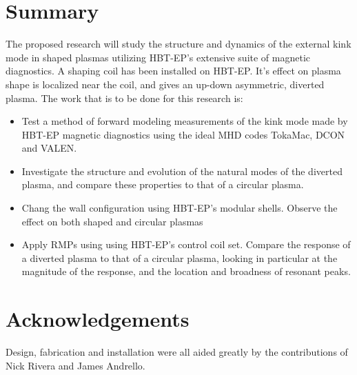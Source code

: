 \documentclass[aps,preprint,showpacs,superscriptaddress,groupedaddress]{revtex4}  %
\begin{document}
\section{Summary}
The proposed research will study the structure and dynamics of the external kink mode in shaped plasmas utilizing HBT-EP's extensive suite of magnetic diagnostics.  A shaping coil has been installed on HBT-EP.  It's effect on plasma shape is localized near the coil, and gives an up-down asymmetric, diverted plasma.  The work that is to be done for this research is:
\begin{itemize}
\item Test a method of forward modeling measurements of the kink mode made by HBT-EP magnetic diagnostics using the ideal MHD codes TokaMac, DCON and VALEN.
\item Investigate the structure and evolution of the natural modes of the diverted plasma, and compare these properties to that of a circular plasma.
\item Chang the wall configuration using HBT-EP's modular shells.  Observe the effect on both shaped and circular plasmas
\item Apply RMPs using using HBT-EP's control coil set.  Compare the response of a diverted plasma to that of a circular plasma, looking in particular at the magnitude of the response, and the location and broadness of resonant peaks.
\end{itemize}

\newpage
\section{Acknowledgements}
Design, fabrication and installation were all aided greatly by the contributions of Nick Rivera and James Andrello.
\end{document}
